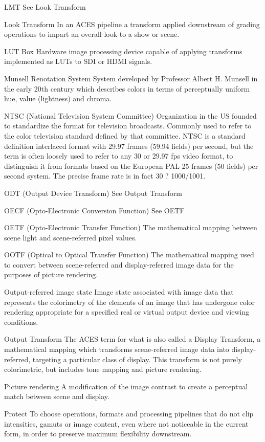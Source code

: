 LMT
See Look Transform

Look Transform
In an ACES pipeline a transform applied downstream of grading operations to impart an overall look to a show or scene.

LUT Box
Hardware image processing device capable of applying transforms implemented as LUTs to SDI or HDMI signals.

Munsell Renotation System
System developed by Professor Albert H. Munsell in the early 20th century which describes colors in terms of perceptually uniform hue, value (lightness) and chroma.

NTSC (National Television System Committee)
Organization in the US founded to standardize the format for television broadcasts. Commonly used to refer to the color television standard defined by that committee. NTSC is a standard definition interlaced format with 29.97 frames (59.94 fields) per second, but the term is often loosely used to refer to any 30 or 29.97 fps video format, to distinguish it from formats based on the European PAL 25 frames (50 fields) per second system. The precise frame rate is in fact 30 ? 1000/1001.

ODT (Output Device Transform)
See Output Transform

OECF (Opto-Electronic Conversion Function)
See OETF

OETF (Opto-Electronic Transfer Function)
The mathematical mapping between scene light and scene-referred pixel values.

OOTF (Optical to Optical Transfer Function)
The mathematical mapping used to convert between scene-referred and display-referred image data for the purposes of picture rendering.

Output-referred image state
Image state associated with image data that represents the colorimetry of the elements of an image that has undergone color rendering appropriate for a specified real or virtual output device and viewing conditions.

Output Transform
The ACES term for what is also called a Display Transform, a mathematical mapping which transforms scene-referred image data into display-referred, targeting a particular class of display. This transform is not purely colorimetric, but includes tone mapping and picture rendering.

Picture rendering
A modification of the image contrast to create a perceptual match between scene and display.

Protect
To choose operations, formats and processing pipelines that do not clip intensities, gamuts or image content, even where not noticeable in the current form, in order to preserve maximum flexibility downstream.

